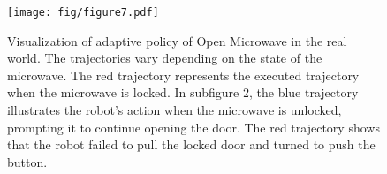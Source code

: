 \begin{figure}[h]
  \vspace{-2mm}
  \centering
  \texttt{[image: fig/figure7.pdf]}
    \vspace{-1.4cm}
  \caption{Visualization of adaptive policy of Open Microwave in the real world. The trajectories vary depending on the state of the microwave.  The red trajectory represents the executed trajectory when the microwave is locked. In subfigure 2, the blue trajectory illustrates the robot's action when the microwave is unlocked, prompting it to continue opening the door. The red trajectory shows that the robot failed to pull the locked door and turned to push the button.
  }
  \label{fig:real_micro}
\vspace{-2mm}
\end{figure}
